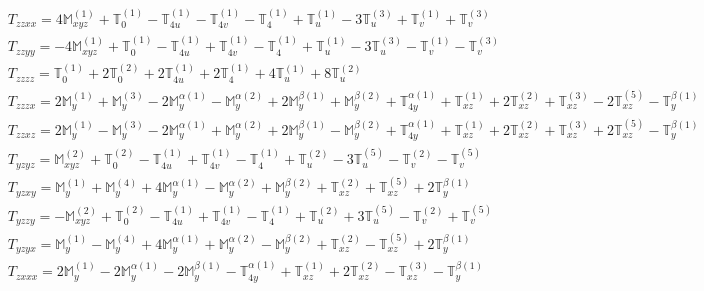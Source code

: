 \documentclass[fleqn,8pt,landscape]{jsarticle}
\begin{document}
\begin{align*}
& T_{zzxx} = 4 \mathbb{M}_{xyz}^{(1)} + \mathbb{T}_{0}^{(1)} - \mathbb{T}_{4u}^{(1)} - \mathbb{T}_{4v}^{(1)} - \mathbb{T}_{4}^{(1)} + \mathbb{T}_{u}^{(1)} - 3 \mathbb{T}_{u}^{(3)} + \mathbb{T}_{v}^{(1)} + \mathbb{T}_{v}^{(3)} \\
& T_{zzyy} = - 4 \mathbb{M}_{xyz}^{(1)} + \mathbb{T}_{0}^{(1)} - \mathbb{T}_{4u}^{(1)} + \mathbb{T}_{4v}^{(1)} - \mathbb{T}_{4}^{(1)} + \mathbb{T}_{u}^{(1)} - 3 \mathbb{T}_{u}^{(3)} - \mathbb{T}_{v}^{(1)} - \mathbb{T}_{v}^{(3)} \\
& T_{zzzz} = \mathbb{T}_{0}^{(1)} + 2 \mathbb{T}_{0}^{(2)} + 2 \mathbb{T}_{4u}^{(1)} + 2 \mathbb{T}_{4}^{(1)} + 4 \mathbb{T}_{u}^{(1)} + 8 \mathbb{T}_{u}^{(2)} \\
& T_{zzzx} = 2 \mathbb{M}_{y}^{(1)} + \mathbb{M}_{y}^{(3)} - 2 \mathbb{M}_{y}^{\alpha(1)} - \mathbb{M}_{y}^{\alpha(2)} + 2 \mathbb{M}_{y}^{\beta(1)} + \mathbb{M}_{y}^{\beta(2)} + \mathbb{T}_{4y}^{\alpha(1)} + \mathbb{T}_{xz}^{(1)} + 2 \mathbb{T}_{xz}^{(2)} + \mathbb{T}_{xz}^{(3)} - 2 \mathbb{T}_{xz}^{(5)} - \mathbb{T}_{y}^{\beta(1)} \\
& T_{zzxz} = 2 \mathbb{M}_{y}^{(1)} - \mathbb{M}_{y}^{(3)} - 2 \mathbb{M}_{y}^{\alpha(1)} + \mathbb{M}_{y}^{\alpha(2)} + 2 \mathbb{M}_{y}^{\beta(1)} - \mathbb{M}_{y}^{\beta(2)} + \mathbb{T}_{4y}^{\alpha(1)} + \mathbb{T}_{xz}^{(1)} + 2 \mathbb{T}_{xz}^{(2)} + \mathbb{T}_{xz}^{(3)} + 2 \mathbb{T}_{xz}^{(5)} - \mathbb{T}_{y}^{\beta(1)} \\
& T_{yzyz} = \mathbb{M}_{xyz}^{(2)} + \mathbb{T}_{0}^{(2)} - \mathbb{T}_{4u}^{(1)} + \mathbb{T}_{4v}^{(1)} - \mathbb{T}_{4}^{(1)} + \mathbb{T}_{u}^{(2)} - 3 \mathbb{T}_{u}^{(5)} - \mathbb{T}_{v}^{(2)} - \mathbb{T}_{v}^{(5)} \\
& T_{yzxy} = \mathbb{M}_{y}^{(1)} + \mathbb{M}_{y}^{(4)} + 4 \mathbb{M}_{y}^{\alpha(1)} - \mathbb{M}_{y}^{\alpha(2)} + \mathbb{M}_{y}^{\beta(2)} + \mathbb{T}_{xz}^{(2)} + \mathbb{T}_{xz}^{(5)} + 2 \mathbb{T}_{y}^{\beta(1)} \\
& T_{yzzy} = - \mathbb{M}_{xyz}^{(2)} + \mathbb{T}_{0}^{(2)} - \mathbb{T}_{4u}^{(1)} + \mathbb{T}_{4v}^{(1)} - \mathbb{T}_{4}^{(1)} + \mathbb{T}_{u}^{(2)} + 3 \mathbb{T}_{u}^{(5)} - \mathbb{T}_{v}^{(2)} + \mathbb{T}_{v}^{(5)} \\
& T_{yzyx} = \mathbb{M}_{y}^{(1)} - \mathbb{M}_{y}^{(4)} + 4 \mathbb{M}_{y}^{\alpha(1)} + \mathbb{M}_{y}^{\alpha(2)} - \mathbb{M}_{y}^{\beta(2)} + \mathbb{T}_{xz}^{(2)} - \mathbb{T}_{xz}^{(5)} + 2 \mathbb{T}_{y}^{\beta(1)} \\
& T_{zxxx} = 2 \mathbb{M}_{y}^{(1)} - 2 \mathbb{M}_{y}^{\alpha(1)} - 2 \mathbb{M}_{y}^{\beta(1)} - \mathbb{T}_{4y}^{\alpha(1)} + \mathbb{T}_{xz}^{(1)} + 2 \mathbb{T}_{xz}^{(2)} - \mathbb{T}_{xz}^{(3)} - \mathbb{T}_{y}^{\beta(1)} \\

\end{align*}
\end{document}
